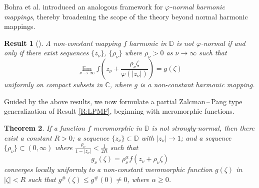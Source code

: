 \documentclass[10pt,a4paper]{amsart}
\newtheorem{theorem}{Theorem}[section]
\newtheorem{Result}[theorem]{Result}
\numberwithin{equation}{section}
\begin{document}
Bohra et al. introduced an analogous framework for \emph{$\varphi$-normal harmonic mappings}, thereby
broadening the scope of the theory beyond normal harmonic mappings.
\begin{Result}[{\cite[Theorem 1.3]{bohra-lfptfpnhm-2025}}] \label{R:LPPNHM}
A non-constant mapping $f$ harmonic in $\mathbb D$ is not $\varphi$-normal if and only if there exist sequences $\{z_{\nu}\}$, $\{\rho_{\nu} \}$ where $\rho_{\nu} >0$ as $\nu\to\infty$ such that 
\begin{equation*}\lim_{\nu\to\infty} f\left(z_{\nu}+\frac{\rho_{\nu} \zeta}{\varphi(|z_{\nu}|)}\right)=g(\zeta)\end{equation*}
uniformly on compact subsets in $\mathbb C$, where $g$ is a non-constant harmonic mapping.
\end{Result}
Guided by the above results, we now formulate a partial Zalcman\,–\,Pang type generalization of Result \ref{R:LPMF}, beginning with meromorphic functions.

\begin{theorem} \label{T:FPZPSNMF}
    If a function $f$ meromorphic in $\mathbb D$ is not strongly-normal, then there exist a constant 
    $R>0$; a sequence $\{z_{\nu}\}\subset \mathbb D$ with $|z_{\nu}|\to1$; and a sequence 
    $\{\rho_{\nu} \}\subset (0,\infty)$ where $\displaystyle\frac{\rho_{\nu} }{1-|z_{\nu}|}<\frac{1}{2R}$ 
    such that \begin{equation*}g_{\nu}(\zeta)=\rho_{\nu} ^{\alpha}f(z_{\nu}+\rho_{\nu} \zeta)\end{equation*}
    converges locally uniformly to a non-constant meromorphic function $g(\zeta)$ in $|\zeta|<R$ 
    such that $g^\#(\zeta)\le g^\#(0)\neq 0$, where $\alpha\geq 0$. 
\end{theorem}
\end{document}
